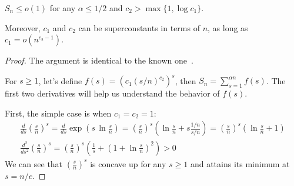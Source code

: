 \begin{proposition}
    \label{pro:bound-prob-large-sets}
    $S_n\leq o(1)$ for any $\alpha\leq 1/2$ and $c_2>\max\{1,\log c_1\}$.
    
    Moreover, $c_1$ and $c_2$ can be superconstants in terms of $n$,
    as long as $c_1=o\left(n^{c_2-1}\right)$.
\end{proposition}

\begin{proof}
    The argument is identical to the known one~\cite{gms03}.
    
    For $s\geq1$, let's define $f(s)=\left(c_1(s/n)^{c_2}\right)^s$, then
    $S_n=\sum_{s=1}^{\alpha n}{f(s)}$.
    The first two derivatives will help us understand the behavior of $f(s)$.
    
    First, the simple case is when $c_1=c_2=1$:
    \begin{gather*}
        \frac{d}{ds}\left(\frac{s}{n}\right)^s
        =\frac{d}{ds}\exp\left(s\,\ln\frac{s}{n}\right)
        =\left(\frac{s}{n}\right)^s\left(\ln\frac{s}{n}+s\frac{1/n}{s/n}\right)
        =\left(\frac{s}{n}\right)^s\left(\ln\frac{s}{n}+1\right)\\
        \frac{d^2}{ds^2}\left(\frac{s}{n}\right)^s
        =\left(\frac{s}{n}\right)^s\left(\frac{1}{s}+\left(1+\ln\frac{s}{n}\right)^2\right)>0
    \end{gather*}
    We can see that $\left(\frac{s}{n}\right)^s$ is concave up for any $s\geq1$
    and attains its minimum at $s=n/e$.
    

\end{proof}

